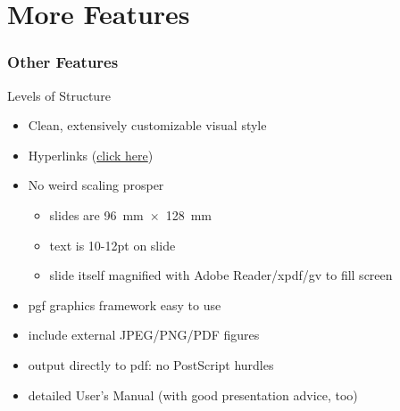 \documentclass[aspectratio=169]{beamer}
\begin{document}
    \section{More Features}

    \begin{frame}
        \frametitle{Other Features}

        \begin{block}{Levels of Structure}
            \begin{itemize}
                \item Clean, extensively customizable visual style
                \item Hyperlinks (\href{http://github.com/izahn/iqss-beamer-theme}{click here})
                \item No weird scaling prosper
                \begin{itemize}
                    \item slides are 96~mm~$\times$~128~mm

                    \item text is 10-12pt on slide

                    \item slide itself magnified with Adobe Reader/xpdf/gv to fill screen
                \end{itemize}

                \item pgf graphics framework easy to use

                \item include external JPEG/PNG/PDF figures

                \item output directly to pdf: no PostScript hurdles

                \item detailed User's Manual (with good presentation advice, too)
            \end{itemize}
        \end{block}
    \end{frame}
\end{document}
